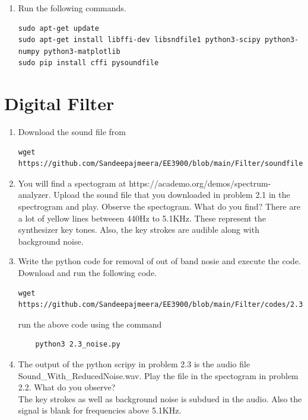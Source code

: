 \documentclass[journal,12pt,twocolumn]{IEEEtran}
\renewcommand\thesection{\arabic{section}}
\begin{document}
\begin{enumerate}[label=\thesection.\arabic*
,ref=\thesection.\theenumi]
\item Run the following commands.
\begin{lstlisting}
sudo apt-get update
sudo apt-get install libffi-dev libsndfile1 python3-scipy python3-numpy python3-matplotlib
sudo pip install cffi pysoundfile
\end{lstlisting}
\end{enumerate}

\section{Digital Filter}

\begin{enumerate}[label=\thesection.\arabic*
,ref=\thesection.\theenumi]
\item Download the sound file from
\begin{lstlisting}
wget https://github.com/Sandeepajmeera/EE3900/blob/main/Filter/soundfiles/Sound_Noise.wav
\end{lstlisting}

\item You will find a spectogram at https://academo.org/demos/spectrum-analyzer. Upload the sound file that you downloaded in problem 2.1 in the spectrogram and play. Observe the spectogram. What do you find?
\solution There are a lot of yellow lines betweeen 440Hz to 5.1KHz. These represent the synthesizer key tones. Also, the key strokes are audible along with background noise.

\item Write the python code for removal of out of band nosie and execute the code.\label{2.3}\\
\solution Download and run the following code.
\begin{lstlisting}
wget https://github.com/Sandeepajmeera/EE3900/blob/main/Filter/codes/2.3_noise.py
\end{lstlisting}
run the above code using the command
\begin{lstlisting}
	python3 2.3_noise.py
\end{lstlisting}

\item The output of the python scripy in problem 2.3 is the audio file Sound\_With\_ReducedNoise.wav. Play the file in the spectogram in problem 2.2. What do you observe?\\
\solution The key strokes as well as background noise is subdued in the audio. Also the signal is blank for frequencies above 5.1KHz.
\end{enumerate}
\end{document}
